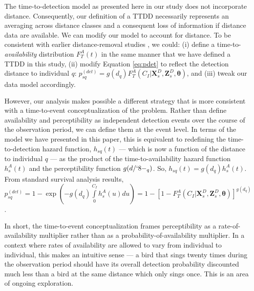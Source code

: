 \documentclass[useAMS,usenatbib,referee,12pt]{article}
\begin{document}
The time-to-detection model as presented here in our study does not incorporate distance.  
Consequently, our definition of a TTDD necessarily represents an averaging across distance classes and a consequent loss of information if distance data are available.  
We can modify our model to account for distance.  
To be consistent with earlier distance-removal studies \citep{Farnsworth2005, Amundson2014}, we could: (i) define a time-to-\textit{availability} distribution $F_T^A(t)$ in the same manner that we have defined a TTDD in this study, (ii) modify Equation \ref{eq:pdet} to reflect the detection distance to individual $q$: $p_{sq}^{(det)} = g(d_q) F_T^A(C_I|\textbf{X}_{s}^D, \textbf{Z}_{s}^D, \boldsymbol{\theta})$, and (iii) tweak our data model accordingly.

However, our analysis makes possible a different strategy that is more consistent with a time-to-event conceptualization of the problem.  
Rather than define availability and perceptibility as independent detection events over the course of the observation period, we can define them at the event level.  
In terms of the model we have presented in this paper, this is equivalent to redefining the time-to-detection hazard function, $h_{sq}(t)$ --- which is now a function of the distance to individual $q$ --- as the product of the time-to-availability hazard function $h_{s}^A(t)$ and the perceptibility function $g(d/`8-_q)$.  
So, $h_{sq}(t) = g(d_q) h_{s}^A(t)$.  
From standard survival analysis results, $p_{sq}^{(det)} = 1 - \exp\left(-g(d_q)\int\limits_0^{C_I} h_{s}^A(u)du\right) = 1 - \left[1 - F_T^A(C_I|\textbf{X}_{s}^D, \textbf{Z}_{s}^D, \boldsymbol{\theta}) \right]^{g(d_q)}$.

In short, the time-to-event conceptualization frames perceptibility as a rate-of-availability multiplier rather than as a probability-of-availability multiplier.  
In a context where rates of availability are allowed to vary from individual to individual, this makes an intuitive sense --- a bird that sings twenty times during the observation period should have its overall detection probability discounted much less than a bird at the same distance which only sings once.  
This is an area of ongoing exploration.


\end{document}
